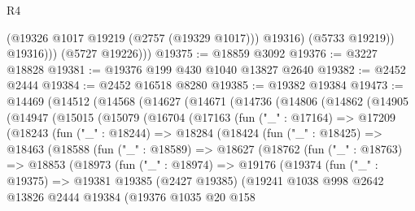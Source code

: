 \begin{lexlean}{R4}
\begin{coremodule}
                  (@19326 @1017 @19219 (@2757 (@19329 @1017)))
                  @19316)
                (@5733 @19219))
              @19316)))
        (@5727 @19226)))
@19375 := @18859 @3092
@19376 := @3227 @18828
@19381 := @19376 @199 @430 @1040 @13827 @2640
@19382 := @2452 @2444
@19384 := @2452 @16518 @8280
@19385 := @19382 @19384
@19473 := @14469
    (@14512
      (@14568
        (@14627
          (@14671
            (@14736
              (@14806
                (@14862
                  (@14905
                    (@14947
                      (@15015
                        (@15079
                          (@16704
                            (@17163
                              (fun ("_" : @17164) =>
                              @17209
                                (@18243
                                  (fun ("_" : @18244) =>
                                  @18284
                                    (@18424
                                      (fun ("_" : @18425) =>
                                      @18463
                                        (@18588
                                          (fun ("_" : @18589) =>
                                          @18627
                                            (@18762
                                              (fun ("_" : @18763) =>
                                              @18853
                                                (@18973
                                                  (fun ("_" : @18974) =>
                                                  @19176
                                                    (@19374
                                                      (fun ("_" : @19375) =>
                                                      @19381
                                                        @19385
                                                        (@2427 @19385)
                                                        (@19241
                                                          @1038
                                                          @998
                                                          @2642
                                                          @13826
                                                          @2444
                                                          @19384
                                                          (@19376
                                                            @1035
                                                            @20
                                                            @158

\end{coremodule}
\end{lexlean}
